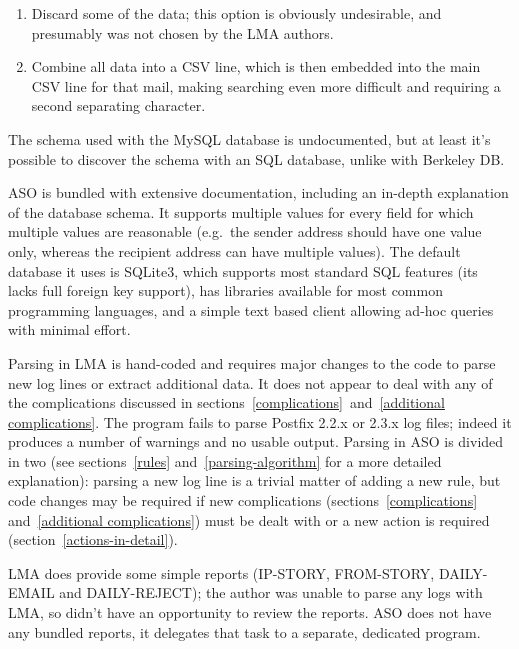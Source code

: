 \documentclass[a4paper,12pt,draft]{article}
\newcommand{\parsername}{ASO}
\begin{document}
\begin{enumerate}

    \item Discard some of the data; this option is obviously undesirable,
        and presumably was not chosen by the LMA authors.

    \item Combine all data into a CSV line, which is then embedded into the
        main CSV line for that mail, making searching even more difficult
        and requiring a second separating character.

\end{enumerate}

The schema used with the MySQL database is undocumented, but at least it's
possible to discover the schema with an SQL database, unlike with Berkeley
DB\@.

\parsername{} is bundled with extensive documentation, including an in-depth
explanation of the database schema.  It supports multiple values for every
field for which multiple values are reasonable (e.g.\ the sender address
should have one value only, whereas the recipient address can have
multiple values).  The default database it uses is SQLite3, which supports
most standard SQL features (its lacks full foreign key support), has
libraries available for most common programming languages, and a simple
text based client allowing ad-hoc queries with minimal effort.

Parsing in LMA is hand-coded and requires major changes to the code to
parse new log lines or extract additional data.  It does not appear to deal
with any of the complications discussed in
sections~\ref{complications}~and~\ref{additional complications}.  The
program fails to parse Postfix 2.2.x or 2.3.x log files; indeed it produces
a number of warnings and no usable output.  Parsing in \parsername{} is
divided in two (see sections~\ref{rules} and~\ref{parsing-algorithm} for a
more detailed explanation): parsing a new log line is a trivial matter of
adding a new rule, but code changes may be required if new complications
(sections~\ref{complications} and~\ref{additional complications}) must be
dealt with or a new action is required (section~\ref{actions-in-detail}).

LMA does provide some simple reports (IP-STORY, FROM-STORY, DAILY-EMAIL and
DAILY-REJECT); the author was unable to parse any logs with LMA, so didn't
have an opportunity to review the reports.  \parsername{} does not have any
bundled reports, it delegates that task to a separate, dedicated program.
\end{document}
